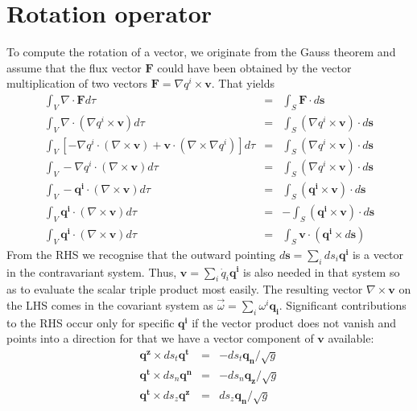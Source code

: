 \section{Rotation operator}

To compute the rotation of a vector, we originate from the Gauss theorem and assume that the flux vector
$\mathbf{F}$ could have been obtained by the vector multiplication of two vectors
$\mathbf{F}=\nabla q^i\times\mathbf{v}$. That yields
\begin{eqnarray*}
 \int_V\nabla\cdot\mathbf{F}d\tau&=&\int_S\mathbf{F}\cdot d\mathbf{s}\\
 \int_V\nabla\cdot(\nabla q^i\times\mathbf{v})d\tau&=&\int_S(\nabla q^i\times\mathbf{v})\cdot d\mathbf{s}\\
 \int_V[-\nabla q^i\cdot(\nabla\times\mathbf{v})
       +\mathbf{v}\cdot(\nabla\times\nabla q^i)]d\tau&=&\int_S(\nabla q^i\times\mathbf{v})\cdot d\mathbf{s}\\
 \int_V-\nabla q^i\cdot(\nabla\times\mathbf{v})d\tau&=&\int_S(\nabla q^i\times\mathbf{v})\cdot d\mathbf{s}\\
 \int_V-\mathbf{q^i}\cdot(\nabla\times\mathbf{v})d\tau&=&\int_S(\mathbf{q^i}\times\mathbf{v})\cdot d\mathbf{s}\\
 \int_V\mathbf{q^i}\cdot(\nabla\times\mathbf{v})d\tau&=&-\int_S(\mathbf{q^i}\times\mathbf{v})\cdot d\mathbf{s}\\
 \int_V\mathbf{q^i}\cdot(\nabla\times\mathbf{v})d\tau&=&\int_S\mathbf{v}\cdot(\mathbf{q^i}\times d\mathbf{s})
\end{eqnarray*}
From the RHS we recognise that the outward pointing $d\mathbf{s}=\sum_ids_i\mathbf{q^i}$ is a vector in the contravariant system. Thus, $\mathbf{v}=\sum_i \dot{q}_i \mathbf{q^i}$ is also needed in that system so as to evaluate the scalar triple product most easily. The resulting vector $\nabla\times\mathbf{v}$ on the LHS comes in the covariant system as $\vec{\omega}=\sum_i\omega^i\mathbf{q_i}$. Significant contributions to the RHS occur
only for specific $\mathbf{q^i}$ if the vector product does not vanish and points into a direction
for that we have a vector component of $\mathbf{v}$ available:
\begin{eqnarray*}
 \mathbf{q^z}\times ds_t\mathbf{q^t}&=&-ds_t\mathbf{q_n}/\sqrt{g}\\
 \mathbf{q^t}\times ds_n\mathbf{q^n}&=&-ds_n\mathbf{q_z}/\sqrt{g}\\
 \mathbf{q^t}\times ds_z\mathbf{q^z}&=&ds_z\mathbf{q_n}/\sqrt{g}
\end{eqnarray*}
